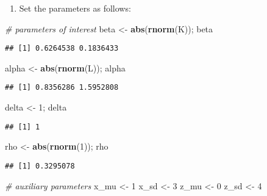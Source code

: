 \documentclass[
]{book}
\newenvironment{Shaded}{\begin{snugshade}}{\end{snugshade}}
\newcommand{\CommentTok}[1]{\textcolor[rgb]{0.56,0.35,0.01}{\textit{#1}}}
\newcommand{\DecValTok}[1]{\textcolor[rgb]{0.00,0.00,0.81}{#1}}
\newcommand{\KeywordTok}[1]{\textcolor[rgb]{0.13,0.29,0.53}{\textbf{#1}}}
\newcommand{\NormalTok}[1]{#1}
\newcommand{\StringTok}[1]{\textcolor[rgb]{0.31,0.60,0.02}{#1}}
\providecommand{\tightlist}{%
  \setlength{\itemsep}{0pt}\setlength{\parskip}{0pt}}
\begin{document}
\begin{enumerate}
\def\labelenumi{\arabic{enumi}.}
\setcounter{enumi}{1}
\tightlist
\item
  Set the parameters as follows:
\end{enumerate}

\begin{Shaded}
\begin{Highlighting}[]
\CommentTok{# parameters of interest}
\NormalTok{beta <-}\StringTok{ }\KeywordTok{abs}\NormalTok{(}\KeywordTok{rnorm}\NormalTok{(K)); beta}
\end{Highlighting}
\end{Shaded}

\begin{verbatim}
## [1] 0.6264538 0.1836433
\end{verbatim}

\begin{Shaded}
\begin{Highlighting}[]
\NormalTok{alpha <-}\StringTok{ }\KeywordTok{abs}\NormalTok{(}\KeywordTok{rnorm}\NormalTok{(L)); alpha}
\end{Highlighting}
\end{Shaded}

\begin{verbatim}
## [1] 0.8356286 1.5952808
\end{verbatim}

\begin{Shaded}
\begin{Highlighting}[]
\NormalTok{delta <-}\StringTok{ }\DecValTok{1}\NormalTok{; delta}
\end{Highlighting}
\end{Shaded}

\begin{verbatim}
## [1] 1
\end{verbatim}

\begin{Shaded}
\begin{Highlighting}[]
\NormalTok{rho <-}\StringTok{ }\KeywordTok{abs}\NormalTok{(}\KeywordTok{rnorm}\NormalTok{(}\DecValTok{1}\NormalTok{)); rho}
\end{Highlighting}
\end{Shaded}

\begin{verbatim}
## [1] 0.3295078
\end{verbatim}

\begin{Shaded}
\begin{Highlighting}[]
\CommentTok{# auxiliary parameters}
\NormalTok{x_mu <-}\StringTok{ }\DecValTok{1}
\NormalTok{x_sd <-}\StringTok{ }\DecValTok{3}
\NormalTok{z_mu <-}\StringTok{ }\DecValTok{0}
\NormalTok{z_sd <-}\StringTok{ }\DecValTok{4}
\end{Highlighting}
\end{Shaded}
\end{document}
